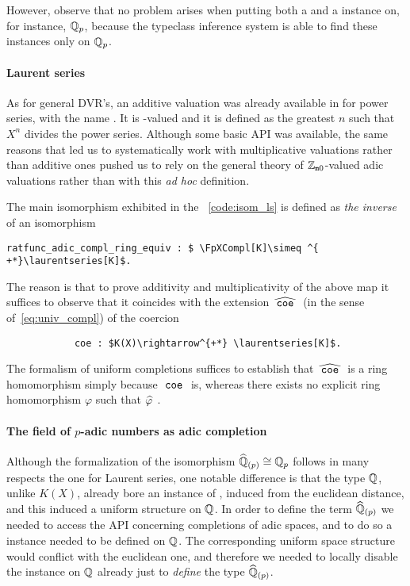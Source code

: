 \documentclass[sigplan,screen]{acmart}
\begin{document}
However, observe that no problem arises when putting both a  and a  instance on, for instance, $\mathbb{Q}_p$, because the typeclass inference system is able to find these instances only on $\mathbb{Q}_p$.

\paragraph{Laurent series}
As for general DVR's, an additive valuation was already available in \mathlib for power series, with the name \href{https://leanprover-community.github.io/mathlib_docs/ring_theory/hahn_series.html#hahn_series.add_val}{\extlink}. It is -valued and it is defined as the greatest $n$ such that $X^n$ divides the power series. Although some basic API was available, the same reasons that led us to systematically work with multiplicative valuations rather than additive ones pushed us to rely on the general theory of $\mathbb{Z}_{\mathtt{m}0}$-valued adic valuations rather than with this \emph{ad hoc} definition.

The main isomorphism  exhibited in the \LClistingname~\ref{code:isom_ls} is defined as \emph{the inverse} of an isomorphism\href{https://github.com/mariainesdff/local_fields_journal/blob/0b408ff3af36e18f991f9d4cb87be3603cfc3fc3/src/laurent_series_equiv_adic_completion.lean#L828}{\extlink}
\begin{lstlisting}
ratfunc_adic_compl_ring_equiv : $ \FpXCompl[K]\simeq ^{ +*}\laurentseries[K]$.
\end{lstlisting}
The reason is that to prove additivity and multiplicativity of the above map it suffices to observe that it coincides with the extension $\compl{\mcode{coe}}$ (in the sense of~\eqref{eq:univ_compl}) of the coercion
\begin{lstlisting}
            coe : $K(X)\rightarrow^{+*} \laurentseries[K]$.
\end{lstlisting}
The formalism of uniform completions suffices to establish that $\compl{\mcode{coe}}$ is a ring homomorphism simply because $\mathtt{\ coe\ }$ is, whereas there exists no explicit ring homomorphism $\varphi$ such that $\compl{\varphi}$ .
 
\paragraph{The field of $p$-adic numbers as adic completion}
Although the formalization of the isomorphism $\widehat{\mathbb{Q}}_{(p)}\cong\mathbb{Q}_p$ follows in many respects the one for Laurent series, one notable difference is that the type $\mathbb{Q}$, unlike $K(X)$, already bore an instance of , induced from the euclidean distance, and this induced a uniform structure on $\mathbb{Q}$. In order to define the term $\widehat{\mathbb{Q}}_{(p)}$ we needed to access the API concerning completions of adic spaces, and to do so a  instance needed to be defined on $\mathbb{Q}$. The corresponding uniform space structure would conflict with the euclidean one, and therefore we needed to locally disable the  instance on $\mathbb{Q}$ already just to \emph{define} the type $\widehat{\mathbb{Q}}_{(p)}$.
\end{document}
